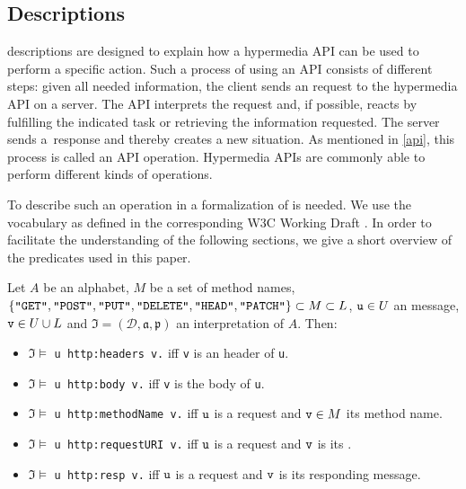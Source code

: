
\subsection{\restdesc Descriptions}\label{rd}

\restdesc descriptions are designed to explain how a hypermedia API can be used to perform a specific action. 
Such a process of using an API consists of different steps:
given all needed information, the client sends an \http request to the hypermedia API on a server.
The API interprets the request and,
if possible, reacts by fulfilling the indicated task
or retrieving the information requested. The server sends a~response and thereby creates a new situation. As mentioned in \cref{api}, this process 
is called an API operation.
Hypermedia APIs are commonly able to perform different kinds of operations.

To describe such an operation in \nthree
a formalization of \http
is needed. 
We use the \rdf vocabulary as defined in the corresponding W3C Working Draft \cite{httprdf}.
In order to facilitate the understanding of the following sections, we give a short overview of the \http predicates used in this paper.

\begin{definition}
Let $A$ be an \nthree alphabet,
$M$ be a set of \http method names,
$\{ \texttt{"GET"},\texttt{"POST"},\texttt{"PUT"},\linebreak[1]
\texttt{"DELETE"},\texttt{"HEAD"},\texttt{"PATCH"}\}\subset M \subset L$,
$\verb!u!\in U$ an \http message,
$\verb!v!\in U\cup L$
and $\mathfrak{I}=(\mathcal{D},\mathfrak{a,p})$ an interpretation of $A$.
Then:


\begin{itemize}
 \item  $\mathfrak{I}\models$ \verb!u http:headers v.! iff \texttt{v} is an \http header of \verb!u!.
 \item $\mathfrak{I}\models$ \verb!u http:body v.! iff \verb!v! is the \http body of \verb!u!. 
  \item $\mathfrak{I}\models$ \verb!u http:methodName v.! iff $\verb!u!$ is a request and 
  $\verb!v!\in M$ its method name.
  \item $\mathfrak{I}\models$ \verb!u http:requestURI v.! iff $\verb!u!$ is a request and $\verb!v!$ is its \URL.
  \item $\mathfrak{I}\models$ \verb!u http:resp v.! iff $\verb!u!$ is a request and $\verb!v!$ is its responding \http message.
\end{itemize}
\end{definition}

